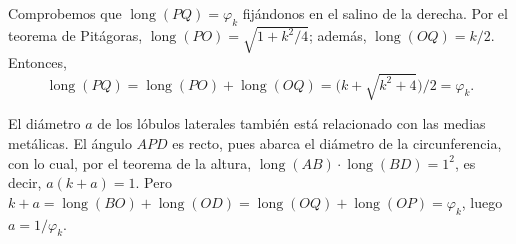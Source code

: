 \documentclass[autocontact]{gaceta}
\begin{document}
Comprobemos que $\operatorname{long}(PQ) = \varphi_k$ fijándonos en el salino de la derecha.
Por el teorema de Pitágoras, $\operatorname{long}(PO) = \sqrt{1+k^2/4}$; además, $\operatorname{long}(OQ) = k/2$. 
Entonces,
\[
\operatorname{long}(PQ) = \operatorname{long}(PO) + \operatorname{long}(OQ)
= \bigl({k + \sqrt{k^2+4}}\bigr)/{2} = \varphi_k.
\]


El diámetro $a$ de los lóbulos laterales también está relacionado con las medias metálicas.
El ángulo $APD$ es recto, pues abarca el diámetro de la circunferencia,
con lo cual, por el teorema de la altura, $\operatorname{long}(AB) \cdot \operatorname{long}(BD) = 1^2$,
es decir, $a(k+a)= 1$. 
Pero $k+a = \operatorname{long}(BO) + \operatorname{\operatorname{long}}(OD) = \operatorname{long}(OQ) + \operatorname{long}(OP) = \varphi_k$, luego $a = {1}/{\varphi_k}$.



%
%
%
%

\medskip

\end{document}
